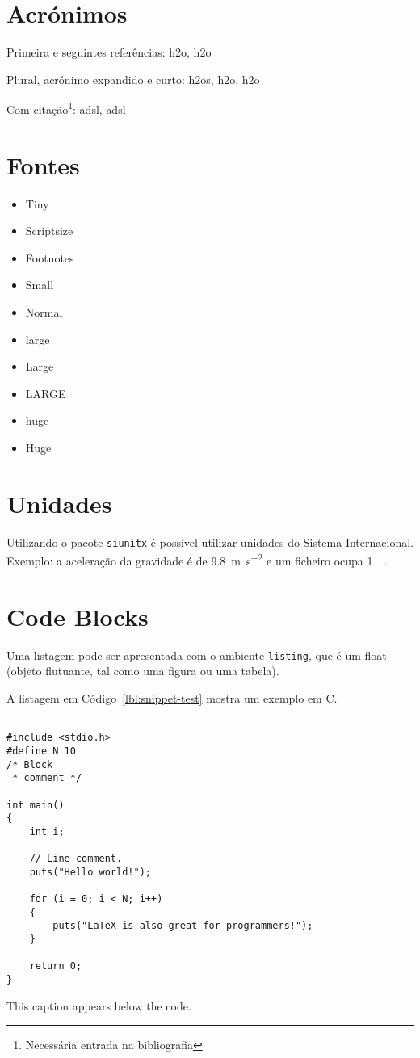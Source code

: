 \section{Acrónimos}

Primeira e seguintes referências: \ac{h2o}, \ac{h2o}

Plural, acrónimo expandido e curto: \acp{h2o}, \acl{h2o}, \acs{h2o}

Com citação\footnote{Necessária entrada na bibliografia}: \ac{adsl}, \ac{adsl}


\section{Fontes}

\begin{itemize}
\item{\tiny Tiny}
\item{\scriptsize Scriptsize}
\item{\footnotesize Footnotes}
\item{\small Small}
\item{\normalsize Normal}
\item{\large large}
\item{\Large Large}
\item{\LARGE LARGE}
\item{\huge huge}
\item{\Huge Huge}
\end{itemize}

\section{Unidades}

Utilizando o pacote \verb|siunitx| é possível utilizar unidades do Sistema Internacional. Exemplo: a aceleração da gravidade é de \SI{9.8}{\metre\per\second\squared} e um ficheiro ocupa \SI{1}{\mebi\byte}. 

\section{Code Blocks}
Uma listagem pode ser apresentada com o ambiente \texttt{listing}, que é um float (objeto flutuante, tal como uma figura ou uma tabela).

A listagem em Código~\ref{lbl:snippet-test} mostra um exemplo em C.

\begin{listing}[h]
\begin{verbatim}

#include <stdio.h>
#define N 10
/* Block
 * comment */
 
int main()
{
    int i;
 
    // Line comment.
    puts("Hello world!");
 
    for (i = 0; i < N; i++)
    {
        puts("LaTeX is also great for programmers!");
    }
 
    return 0;
}
\end{verbatim}
\caption{This caption appears below the code.}
\label{lbl:snippet-test}
\end{listing}

